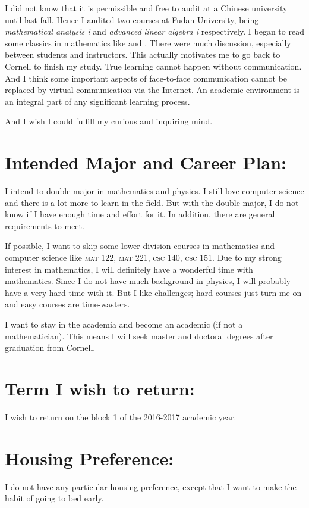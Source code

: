 	I did not know that it is permissible and free to audit at a Chinese university
	until last fall. Hence I audited two courses at Fudan University, being
	\textit{mathematical analysis \Rn{1}} and \textit{advanced linear algebra
		\Rn{1}} respectively. I began to read some classics in mathematics like
	\textcite{BabyRudin} and \textcite{Zorich}. There were much discussion,
	especially between students and instructors. This actually motivates me to go
	back to Cornell to finish my study. True learning cannot happen without
	communication. And I think some important aspects of face-to-face communication
	cannot be replaced by virtual communication via the Internet. An academic
	environment is an integral part of any significant learning process.
	
	And I wish I could fulfill my curious and inquiring mind.
	
	\section*{Intended Major and Career Plan:}
	I intend to double major in mathematics and physics. I still love computer
	science and there is a lot more to learn in the field. But with the double
	major, I do not know if I have enough time and effort for it. In addition,
	there are general requirements to meet.
	
	If possible, I want to skip some lower division courses in mathematics and
	computer science like \textsc{mat} 122, \textsc{mat} 221, \textsc{csc} 140,
	\textsc{csc} 151. Due to my strong interest in mathematics, I will definitely
	have a wonderful time with mathematics. Since I do not have much background in
	physics, I will probably have a very hard time with it. But I like challenges;
	hard courses just turn me on and easy courses are time-wasters.
	
	I want to stay in the academia and become an academic (if not a mathematician).
	This means I will seek master and doctoral degrees after graduation from
	Cornell.

	\section*{Term I wish to return:}
	I wish to return on the block 1 of the 2016-2017 academic year.
	
	\section*{Housing Preference:}
	I do not have any particular housing preference, except that I want to make the
	habit of going to bed early.
	
	\clearpage
	
	\printbibliography
